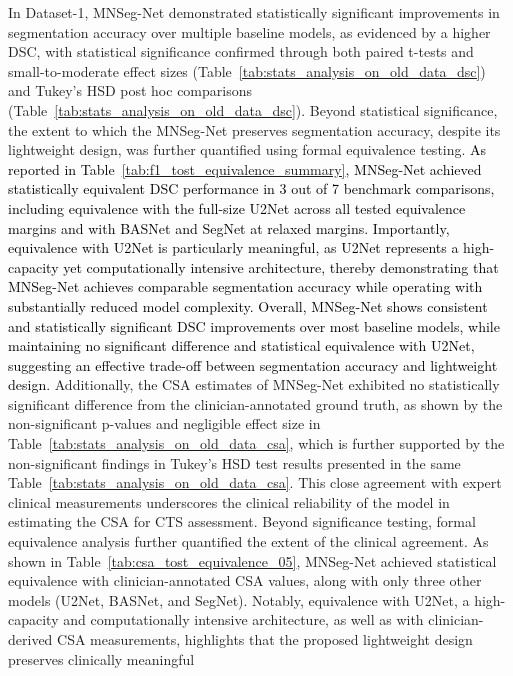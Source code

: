In Dataset-1, MNSeg-Net demonstrated statistically significant improvements in segmentation accuracy over multiple baseline models, as evidenced by a higher DSC, with statistical significance confirmed through both paired t-tests and small-to-moderate effect sizes (Table~\ref{tab:stats_analysis_on_old_data_dsc}) and Tukey’s HSD post hoc comparisons (Table~\ref{tab:stats_analysis_on_old_data_dsc}). Beyond statistical significance, the extent to which the MNSeg-Net preserves segmentation accuracy, despite its lightweight design, was further quantified using formal equivalence testing. \textcolor{black}{As reported in  Table~\ref{tab:f1_tost_equivalence_summary}, MNSeg-Net achieved statistically equivalent DSC performance in 3 out of 7 benchmark comparisons, including equivalence with the full-size U2Net across all tested equivalence margins and with BASNet and SegNet at relaxed margins. Importantly, equivalence with U2Net is particularly meaningful, as U2Net represents a high-capacity yet computationally intensive architecture, thereby demonstrating that MNSeg-Net achieves comparable segmentation accuracy while operating with substantially reduced model complexity.} \textcolor{black}{Overall, MNSeg-Net shows consistent and statistically significant DSC improvements over most baseline models, while maintaining no significant difference and statistical equivalence with U2Net, suggesting an effective trade-off between segmentation accuracy and lightweight design.} Additionally, the CSA estimates of MNSeg-Net exhibited no statistically significant difference from the clinician-annotated ground truth, as shown by the non-significant p-values and negligible effect size in Table~\ref{tab:stats_analysis_on_old_data_csa}, which is further supported by the non-significant findings in Tukey’s HSD test results presented in the same Table~\ref{tab:stats_analysis_on_old_data_csa}. 
This close agreement with expert clinical measurements underscores the clinical reliability of the model in estimating the CSA for CTS assessment. Beyond significance testing, formal equivalence analysis further quantified the extent of the clinical agreement. As shown in Table~\ref{tab:csa_tost_equivalence_05}, MNSeg-Net achieved statistical equivalence with clinician-annotated CSA values, along with only three other models (U2Net, BASNet, and SegNet). Notably, equivalence with U2Net, a high-capacity and computationally intensive architecture, as well as with clinician-derived CSA measurements, highlights that the proposed lightweight design preserves clinically meaningful
